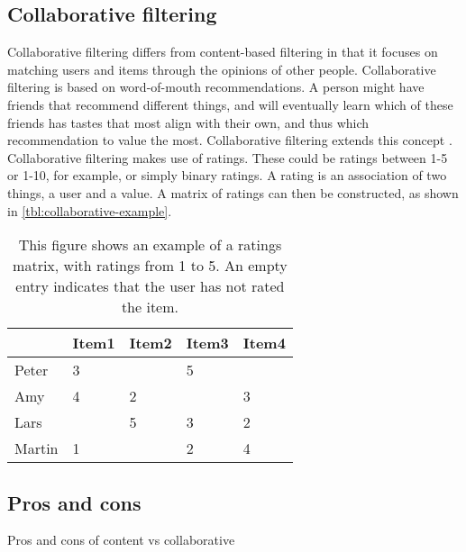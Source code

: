 \subsection{Collaborative filtering}
Collaborative filtering differs from content-based filtering in that it focuses on matching users and items through the opinions of other people.
Collaborative filtering is based on word-of-mouth recommendations.
A person might have friends that recommend different things, and will eventually learn which of these friends has tastes that most align with their own, and thus which recommendation to value the most.
Collaborative filtering extends this concept \cite{CollaborativeFiltering}.
Collaborative filtering makes use of ratings.
These could be ratings between 1-5 or 1-10, for example, or simply binary ratings.
A rating is an association of two things, a user and a value.
A matrix of ratings can then be constructed, as shown in \autoref{tbl:collaborative-example}.
\begin{table}[H]
    \centering
    \begin{tabular}{|l|l|l|l|l|}
    \hline
           & Item1 & Item2 & Item3 & Item4 \\ \hline
    Peter  & 3     &       & 5     &       \\ \hline
    Amy    & 4     & 2     &       & 3     \\ \hline
    Lars   &       & 5     & 3     & 2     \\ \hline
    Martin & 1     &       & 2     & 4     \\ \hline
    \end{tabular}
    \caption{This figure shows an example of a ratings matrix, with ratings from 1 to 5. An empty entry indicates that the user has not rated the item.}
    \label{tbl:collaborative-example}
\end{table}


\subsection{Pros and cons}
Pros and cons of content vs collaborative
